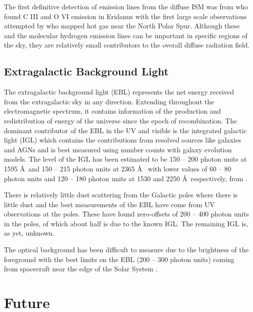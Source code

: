 \documentclass{iau}
\newcommand{\photu}{photon units }
\begin{document}
The first definitive detection of emission lines from the diffuse ISM was from \citet{Murthyvoy1993} who found C III and O VI emission in Eridanus with the first large scale observations attempted by \citet{Welsh_FAUST2007} who mapped hot gas near the North Polar Spur. Although these and the molecular hydrogen emission lines can be important in specific regions of the sky, they are relatively small contributors to the overall diffuse radiation field.

\subsection{Extragalactic Background Light}

The extragalactic background light (EBL) represents the net energy received from the extragalactic sky in any direction. Extending throughout the electromagnetic spectrum, it contains information of the production and redistribution of energy of the universe since the epoch of recombination. The dominant contributor of the EBL in the UV and visible is the integrated galactic light (IGL) which contains the contributions from resolved sources like galaxies and AGNs and is best measured using number counts with galaxy evolution models. The level of the IGL has been estimated to be 150 -- 200 \photu at 1595 \AA\ and 150 -- 215 \photu at 2365 \AA\ \citep{Gardner2000} with lower values of 60 -- 80 \photu and 120 -- 180 \photu at 1530 and 2250 \AA\, respectively, from \citet{Xu2005,Voyer2011,Driver2016}.

There is relatively little dust scattering from the Galactic poles where there is little dust and the best measurements of the EBL have come from UV observations at the poles. These have found zero-offsets of 200 -- 400 \photu in the poles, of which about half is due to the known IGL. The remaining IGL is, as yet, unknown.

The optical background has been difficult to measure due to the brightness of the foreground \citep{Mattila2017, Mattila_EBL2019} with the best limits on the EBL (200 -- 300 photon units) coming from spacecraft near the edge of the Solar System \citep{Toller_EBL,Zemcov_lorri_2017}.

\section{Future}
\end{document}
